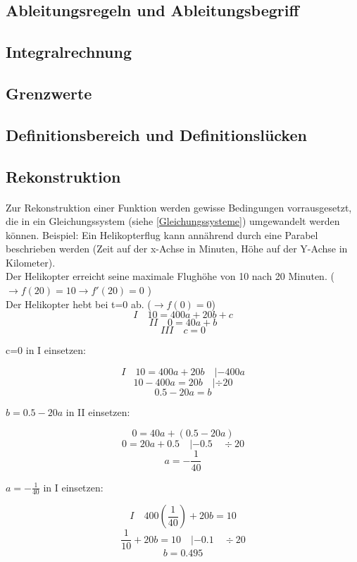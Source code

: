 \documentclass{article}
\begin{document}
\subsection{Ableitungsregeln und Ableitungsbegriff}\label{Ableitungen}
\subsection{Integralrechnung}\label{Integralrechnung}

\subsection{Grenzwerte}
\subsection{Definitionsbereich und Definitionslücken}\label{Definitionsbereich}
\subsection{Rekonstruktion}\label{Rekonstruktion}
\paragraph{}
Zur Rekonstruktion einer Funktion werden gewisse Bedingungen vorrausgesetzt, die in ein Gleichungssystem (siehe \ref{Gleichungssysteme}) umgewandelt werden können.
Beispiel: Ein Helikopterflug kann annährend durch eine Parabel beschrieben werden (Zeit auf der x-Achse in Minuten, Höhe auf der Y-Achse in Kilometer). \\
Der Helikopter erreicht seine maximale Flughöhe von 10 nach 20 Minuten. ( $ \rightarrow f(20)=10 \rightarrow f'(20)=0 $ ) \\
Der Helikopter hebt bei t=0 ab. ($ \rightarrow f(0)=0$) \\

\[ I \quad 10=400a+20b+c \]
\[ II \quad 0=40a+b \]
\[ III \quad c=0 \]

c=0 in I einsetzen:

\[I \quad 10=400a+20b \quad |-400a \]
\[ 10-400a=20b \quad | \div 20\]
\[ 0.5-20a=b\]

$b= 0.5-20a $ in II einsetzen:

\[ 0=40a+(0.5-20a)\]
\[ 0=20a+0.5 \quad |-0.5 \quad \div 20\]
\[ a=-\frac{1}{40} \]

$a=-\frac{1}{40}$ in I einsetzen:

\[ I \quad 400(\frac{1}{40})+20b=10 \]
\[ \frac{1}{10}+20b=10 \quad |-0.1 \quad \div 20\]
\[ b=0.495\]
\end{document}
